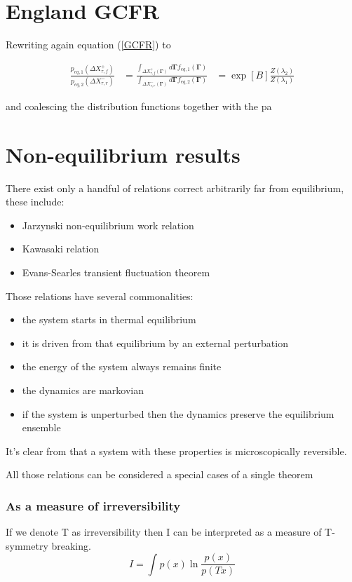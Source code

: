 \documentclass[a4paper,12pt,nofootinbib]{article}
\begin{document}
\section{England GCFR}

Rewriting again equation (\ref{GCFR}) to 

\begin{equation}
  \begin{aligned}
\frac{p_{eq,1}(\Delta X_{\tau,f}^+)}{p_{eq,2}(\Delta X_{\tau,r}^-)}
&=\frac{\int_{\Delta X_{\tau,f}^+(\bm{\Gamma})} d\bm{\Gamma} f_{eq,1}(\bm{\Gamma})}{\int_{\Delta X_{\tau,r}^-(\bm{\Gamma})} d\bm{\Gamma} f_{eq,2}(\bm{\Gamma})} 
&= \exp[B] \frac{Z(\lambda_2)}{Z(\lambda_1)}
\end{aligned}
\end{equation}

and coalescing the distribution functions together with the pa


\section{Non-equilibrium results}
There exist only a handful of relations correct arbitrarily far from equilibrium, these include:
\begin{itemize}
  \item Jarzynski non-equilibrium work relation
  \item Kawasaki relation
  \item Evans-Searles transient fluctuation theorem
\end{itemize}
Those relations have several commonalities:
\begin{itemize}
  \item the system starts in thermal equilibrium
  \item it is driven from that equilibrium by an external perturbation
  \item the energy of the system always remains finite
  \item the dynamics are markovian 
  \item if the system is unperturbed then the dynamics preserve the equilibrium ensemble
\end{itemize}
It's clear from that a system with these properties is microscopically reversible.

All those relations can be considered a special cases of a single theorem

\subsubsection{As a measure of irreversibility}
If we denote T as irreversibility then I can be interpreted as a measure of T-symmetry breaking.
\begin{displaymath}
  I =\int p(x) \ln{\frac{p( x)}{p(T x)}}
\end{displaymath}
\end{document}
